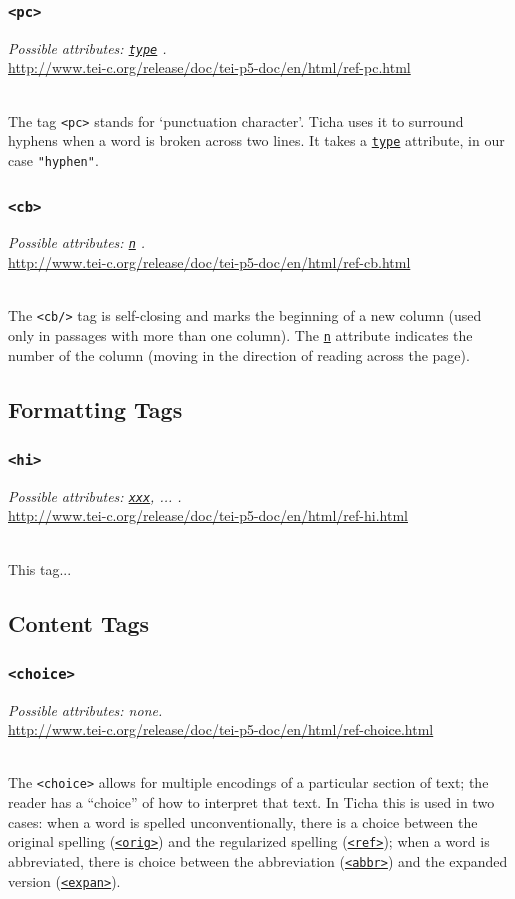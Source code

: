 \documentclass[12pt,a4paper]{article}
\newcommand{\taglinks}[2]{
\vspace*{-0.5ex}
\hspace*{\parindent}
\begin{minipage}{\textwidth}
  \emph{Possible attributes: #1.} \\ \url{#2} \end{minipage} \vspace{0.5ex} \\ }
\begin{document}
\subsubsection{\texttt{<pc>}} \label{tag-sec:pc}
\taglinks{
\hyperref[att-sec:type]{\texttt{type}}
}
{http://www.tei-c.org/release/doc/tei-p5-doc/en/html/ref-pc.html}
%
The tag \texttt{<pc>} stands for `punctuation character'.  Ticha uses it to surround hyphens when a word is broken across two lines.  It takes a \hyperref[att-sec:type]{\texttt{type}} attribute, in our case \texttt{"hyphen"}.

\subsubsection{\texttt{<cb>}} \label{tag-sec:cb}
\taglinks{
\hyperref[att-sec:n]{\texttt{n}}
}
{http://www.tei-c.org/release/doc/tei-p5-doc/en/html/ref-cb.html}
%
The \texttt{<cb/>} tag is self-closing and marks the beginning of a new column (used only in passages with more than one column).  The \hyperref[att-sec:n]{\texttt{n}} attribute indicates the number of the column (moving in the direction of reading across the page).

\subsection{Formatting Tags}

\subsubsection{\texttt{<hi>}} \label{tag-sec:hi}
\taglinks{
\hyperref[att-sec:xxx]{\texttt{xxx}}, ... }
{http://www.tei-c.org/release/doc/tei-p5-doc/en/html/ref-hi.html}
This tag...



\subsection{Content Tags}

\subsubsection{\texttt{<choice>}} \label{tag-sec:choice}
\taglinks{
none}
{http://www.tei-c.org/release/doc/tei-p5-doc/en/html/ref-choice.html}
The \texttt{<choice>} allows for multiple encodings of a particular section of text; the reader has a ``choice'' of how to interpret that text.  In Ticha this is used in two cases: when a word is spelled unconventionally, there is a choice between the original spelling (\hyperref[tag-sec:orig]{\texttt{<orig>}}) and the regularized spelling (\hyperref[tag-sec:ref]{\texttt{<ref>}}); when a word is abbreviated, there is choice between the abbreviation (\hyperref[tag-sec:orig]{\texttt{<abbr>}}) and the expanded version (\hyperref[tag-sec:orig]{\texttt{<expan>}}).
\end{document}
